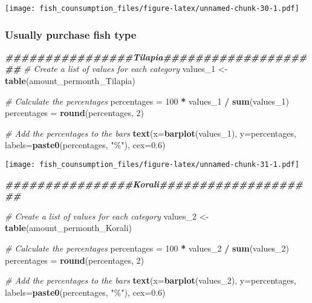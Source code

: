 \documentclass[
]{article}
\newenvironment{Shaded}{\begin{snugshade}}{\end{snugshade}}
\newcommand{\AttributeTok}[1]{\textcolor[rgb]{0.13,0.29,0.53}{#1}}
\newcommand{\CommentTok}[1]{\textcolor[rgb]{0.56,0.35,0.01}{\textit{#1}}}
\newcommand{\DecValTok}[1]{\textcolor[rgb]{0.00,0.00,0.81}{#1}}
\newcommand{\DocumentationTok}[1]{\textcolor[rgb]{0.56,0.35,0.01}{\textbf{\textit{#1}}}}
\newcommand{\FloatTok}[1]{\textcolor[rgb]{0.00,0.00,0.81}{#1}}
\newcommand{\FunctionTok}[1]{\textcolor[rgb]{0.13,0.29,0.53}{\textbf{#1}}}
\newcommand{\NormalTok}[1]{#1}
\newcommand{\OtherTok}[1]{\textcolor[rgb]{0.56,0.35,0.01}{#1}}
\newcommand{\SpecialCharTok}[1]{\textcolor[rgb]{0.81,0.36,0.00}{\textbf{#1}}}
\newcommand{\StringTok}[1]{\textcolor[rgb]{0.31,0.60,0.02}{#1}}
\begin{document}
\texttt{[image: fish\_counsumption\_files/figure-latex/unnamed-chunk-30-1.pdf]}

\hypertarget{usually-purchase-fish-type}{%
\subsubsection{Usually purchase fish
type}\label{usually-purchase-fish-type}}

\begin{Shaded}
\begin{Highlighting}[]
\DocumentationTok{\#\#\#\#\#\#\#\#\#\#\#\#\#\#\#\#Tilapia\#\#\#\#\#\#\#\#\#\#\#\#\#\#\#\#\#\#\#\#}
\CommentTok{\# Create a list of values for each category}
\NormalTok{values\_1 }\OtherTok{\textless{}{-}} \FunctionTok{table}\NormalTok{(amount\_permonth\_Tilapia)}

\CommentTok{\# Calculate the percentages}
\NormalTok{percentages }\OtherTok{=} \DecValTok{100} \SpecialCharTok{*}\NormalTok{ values\_1 }\SpecialCharTok{/} \FunctionTok{sum}\NormalTok{(values\_1)}
\NormalTok{percentages }\OtherTok{=} \FunctionTok{round}\NormalTok{(percentages, }\DecValTok{2}\NormalTok{)}

\CommentTok{\# Add the percentages to the bars}
\FunctionTok{text}\NormalTok{(}\AttributeTok{x=}\FunctionTok{barplot}\NormalTok{(values\_1), }\AttributeTok{y=}\NormalTok{percentages, }\AttributeTok{labels=}\FunctionTok{paste0}\NormalTok{(percentages, }\StringTok{"\%"}\NormalTok{), }\AttributeTok{cex=}\FloatTok{0.6}\NormalTok{)}
\end{Highlighting}
\end{Shaded}

\texttt{[image: fish\_counsumption\_files/figure-latex/unnamed-chunk-31-1.pdf]}

\begin{Shaded}
\begin{Highlighting}[]
\DocumentationTok{\#\#\#\#\#\#\#\#\#\#\#\#\#\#\#\#Korali\#\#\#\#\#\#\#\#\#\#\#\#\#\#\#\#\#\#\#\#}

\CommentTok{\# Create a list of values for each category}
\NormalTok{values\_2 }\OtherTok{\textless{}{-}} \FunctionTok{table}\NormalTok{(amount\_permonth\_Korali)}

\CommentTok{\# Calculate the percentages}
\NormalTok{percentages }\OtherTok{=} \DecValTok{100} \SpecialCharTok{*}\NormalTok{ values\_2 }\SpecialCharTok{/} \FunctionTok{sum}\NormalTok{(values\_2)}
\NormalTok{percentages }\OtherTok{=} \FunctionTok{round}\NormalTok{(percentages, }\DecValTok{2}\NormalTok{)}

\CommentTok{\# Add the percentages to the bars}
\FunctionTok{text}\NormalTok{(}\AttributeTok{x=}\FunctionTok{barplot}\NormalTok{(values\_2), }\AttributeTok{y=}\NormalTok{percentages, }\AttributeTok{labels=}\FunctionTok{paste0}\NormalTok{(percentages, }\StringTok{"\%"}\NormalTok{), }\AttributeTok{cex=}\FloatTok{0.6}\NormalTok{)}
\end{Highlighting}
\end{Shaded}
\end{document}
